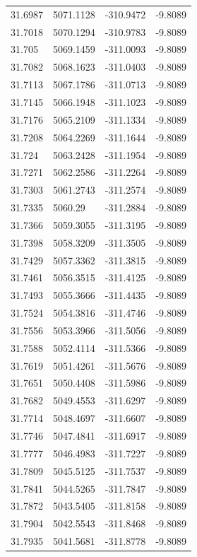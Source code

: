 \begin{table}[H]
\begin{tabular}{llll}
31.6987 & 5071.1128 & -310.9472 & -9.8089 \\
31.7018 & 5070.1294 & -310.9783 & -9.8089 \\
31.705 & 5069.1459 & -311.0093 & -9.8089 \\
31.7082 & 5068.1623 & -311.0403 & -9.8089 \\
31.7113 & 5067.1786 & -311.0713 & -9.8089 \\
31.7145 & 5066.1948 & -311.1023 & -9.8089 \\
31.7176 & 5065.2109 & -311.1334 & -9.8089 \\
31.7208 & 5064.2269 & -311.1644 & -9.8089 \\
31.724 & 5063.2428 & -311.1954 & -9.8089 \\
31.7271 & 5062.2586 & -311.2264 & -9.8089 \\
31.7303 & 5061.2743 & -311.2574 & -9.8089 \\
31.7335 & 5060.29 & -311.2884 & -9.8089 \\
31.7366 & 5059.3055 & -311.3195 & -9.8089 \\
31.7398 & 5058.3209 & -311.3505 & -9.8089 \\
31.7429 & 5057.3362 & -311.3815 & -9.8089 \\
31.7461 & 5056.3515 & -311.4125 & -9.8089 \\
31.7493 & 5055.3666 & -311.4435 & -9.8089 \\
31.7524 & 5054.3816 & -311.4746 & -9.8089 \\
31.7556 & 5053.3966 & -311.5056 & -9.8089 \\
31.7588 & 5052.4114 & -311.5366 & -9.8089 \\
31.7619 & 5051.4261 & -311.5676 & -9.8089 \\
31.7651 & 5050.4408 & -311.5986 & -9.8089 \\
31.7682 & 5049.4553 & -311.6297 & -9.8089 \\
31.7714 & 5048.4697 & -311.6607 & -9.8089 \\
31.7746 & 5047.4841 & -311.6917 & -9.8089 \\
31.7777 & 5046.4983 & -311.7227 & -9.8089 \\
31.7809 & 5045.5125 & -311.7537 & -9.8089 \\
31.7841 & 5044.5265 & -311.7847 & -9.8089 \\
31.7872 & 5043.5405 & -311.8158 & -9.8089 \\
31.7904 & 5042.5543 & -311.8468 & -9.8089 \\
31.7935 & 5041.5681 & -311.8778 & -9.8089 \\

\end{tabular}
\end{table}
